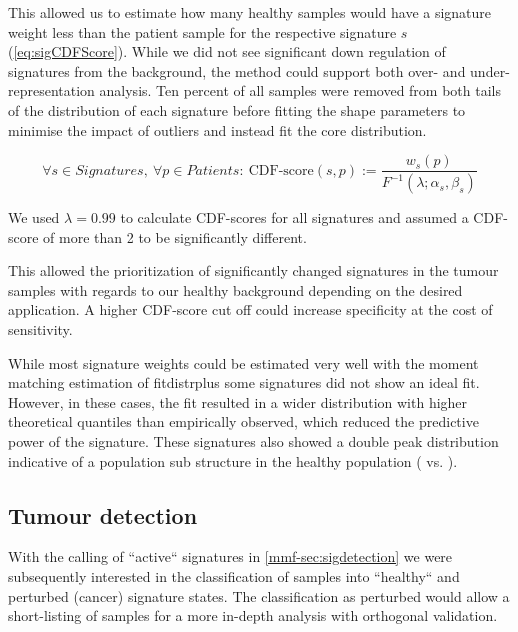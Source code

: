 This allowed us to estimate how many healthy samples would have a signature weight less than the patient sample for the respective signature $s$ (\autoref{eq:sigCDFScore}). While we did not see significant down regulation of signatures from the background, the method could support both over- and under-re\-pre\-sentation analysis. Ten percent of all samples were removed from both tails of the distribution of each signature before fitting the shape parameters to minimise the impact of outliers and instead fit the core distribution.

\begin{equation}
\forall s \in Signatures,\ \forall p \in Patients:\ \text{CDF-score}(s,p) := \frac{w_s(p)}{F^{-1}(\lambda; \alpha_s ,\beta_s)}
\label{eq:sigCDFScore}
\end{equation}
\myequation[\ref{eq:sigCDFScore}]{MisMatchFinder: CDF-score calculation per signature and patient}

We used $\lambda = 0.99$ to calculate CDF-scores for all signatures and assumed a CDF-score of more than 2 to be significantly different.

This allowed the prioritization of significantly changed signatures in the tumour samples with regards to our healthy background depending on the desired application. A higher CDF-score cut off could increase specificity at the cost of sensitivity.

While most signature weights could be estimated very well with the moment matching estimation of fitdistrplus \cite{DelignetteMuller2015} some signatures did not show an ideal fit. However, in these cases, the fit resulted in a wider distribution with higher theoretical quantiles than empirically observed, which reduced the predictive power of the signature. These signatures also showed a double peak distribution indicative of a population sub structure in the healthy population ( vs. ).


\subsection{Tumour detection}
\label{mmf-sec:tumourdetection}

With the calling of ``active`` signatures in \autoref{mmf-sec:sigdetection} we were subsequently interested in the classification of samples into ``healthy`` and perturbed (cancer) signature states. The classification as perturbed would allow a short-listing of samples for a more in-depth analysis with orthogonal validation.

